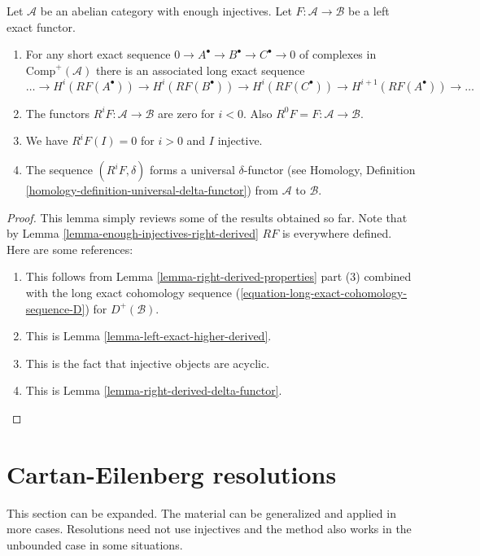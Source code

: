 \begin{lemma}
\label{lemma-higher-derived-functors}
Let $\mathcal{A}$ be an abelian category with enough injectives.
Let $F : \mathcal{A} \to \mathcal{B}$ be a left exact functor.
\begin{enumerate}
\item For any short exact sequence
$0 \to A^\bullet \to B^\bullet \to C^\bullet \to 0$
of complexes in $\text{Comp}^{+}(\mathcal{A})$ there
is an associated long exact sequence
$$
\ldots \to
H^i(RF(A^\bullet)) \to
H^i(RF(B^\bullet)) \to
H^i(RF(C^\bullet)) \to
H^{i + 1}(RF(A^\bullet)) \to \ldots
$$
\item The functors $R^iF : \mathcal{A} \to \mathcal{B}$
are zero for $i < 0$. Also $R^0F = F : \mathcal{A} \to \mathcal{B}$.
\item We have $R^iF(I) = 0$ for $i > 0$ and $I$ injective.
\item The sequence $(R^iF, \delta)$ forms a universal $\delta$-functor (see
Homology, Definition \ref{homology-definition-universal-delta-functor})
from $\mathcal{A}$ to $\mathcal{B}$.
\end{enumerate}
\end{lemma}

\begin{proof}
This lemma simply reviews some of the results obtained so far.
Note that by
Lemma \ref{lemma-enough-injectives-right-derived}
$RF$ is everywhere defined. Here are some references:
\begin{enumerate}
\item This follows from
Lemma \ref{lemma-right-derived-properties} part (3)
combined with the long exact cohomology sequence
(\ref{equation-long-exact-cohomology-sequence-D}) for
$D^{+}(\mathcal{B})$.
\item This is
Lemma \ref{lemma-left-exact-higher-derived}.
\item This is the fact that injective objects are acyclic.
\item This is
Lemma \ref{lemma-right-derived-delta-functor}.
\end{enumerate}
\end{proof}






\section{Cartan-Eilenberg resolutions}
\label{section-cartan-eilenberg}

\noindent
This section can be expanded. The material can be generalized and applied in
more cases. Resolutions need not use injectives and the method also
works in the unbounded case in some situations.

